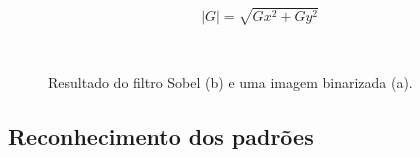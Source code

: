 \documentclass[12pt]{article}
\begin{document}
$$
|G|=\sqrt{Gx^2 + Gy^2}
$$	

\begin{figure}[H]
\centering
\mbox{\quad
{}}
\caption{ Resultado do filtro Sobel (b) e uma imagem binarizada (a).}
\label{fig:remove_fundo}
\end{figure}

\subsection{Reconhecimento dos padrões}
\end{document}
